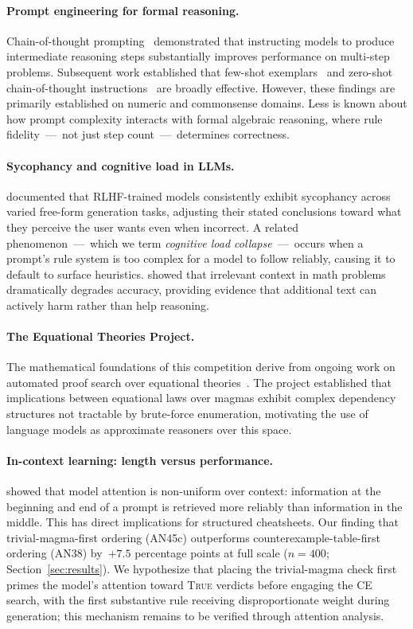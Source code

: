 \documentclass[11pt]{article}
\begin{document}
\paragraph{Prompt engineering for formal reasoning.}
Chain-of-thought prompting~\citep{wei2022cot} demonstrated that
instructing models to produce intermediate reasoning steps substantially
improves performance on multi-step problems. Subsequent work established
that few-shot exemplars~\citep{brown2020gpt3} and zero-shot
chain-of-thought instructions~\citep{kojima2022zeroshot} are broadly
effective. However, these findings are primarily established on numeric
and commonsense domains. Less is known about how prompt complexity
interacts with formal algebraic reasoning, where rule fidelity~---~not
just step count~---~determines correctness.

\paragraph{Sycophancy and cognitive load in LLMs.}
\citet{sharma2023sycophancy} documented that RLHF-trained models
consistently exhibit sycophancy across varied free-form generation
tasks, adjusting their stated conclusions toward what they perceive the
user wants even when incorrect. A related phenomenon~---~which we term
\emph{cognitive load collapse}~---~occurs when a prompt's rule system
is too complex for a model to follow reliably, causing it to default to
surface heuristics. \citet{shi2023distracted} showed that irrelevant
context in math problems dramatically degrades accuracy, providing
evidence that additional text can actively harm rather than help
reasoning.

\paragraph{The Equational Theories Project.}
The mathematical foundations of this competition derive from ongoing
work on automated proof search over equational theories~\citep{tao2025etp}.
The project established that implications between equational laws over
magmas exhibit complex dependency structures not tractable by
brute-force enumeration, motivating the use of language models as
approximate reasoners over this space.

\paragraph{In-context learning: length versus performance.}
\citet{liu2023lost} showed that model attention is non-uniform over
context: information at the beginning and end of a prompt is retrieved
more reliably than information in the middle. This has direct
implications for structured cheatsheets. Our finding that
trivial-magma-first ordering (AN45c) outperforms
counterexample-table-first ordering (AN38) by~$+7.5$ percentage points
at full scale ($n=400$; Section~\ref{sec:results}). We hypothesize that
placing the
trivial-magma check first primes the model's attention toward
\textsc{True} verdicts before engaging the CE search, with the first
substantive rule receiving disproportionate weight during generation;
this mechanism remains to be verified through attention analysis.
\end{document}

